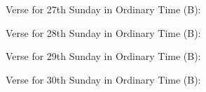 \documentclass[11pt,oneside]{book} %
\begin{document}

\begin{paragraph}\noindent\begin{large}
Verse for 27th Sunday in Ordinary Time (B):
\end{large}\newline\end{paragraph}


\begin{paragraph}\noindent\begin{large}
Verse for 28th Sunday in Ordinary Time (B):
\end{large}\newline\end{paragraph}


\begin{paragraph}\noindent\begin{large}
Verse for 29th Sunday in Ordinary Time (B):
\end{large}\newline\end{paragraph}


\begin{paragraph}\noindent\begin{large}
Verse for 30th Sunday in Ordinary Time (B):
\end{large}\newline\end{paragraph}

\end{document}
